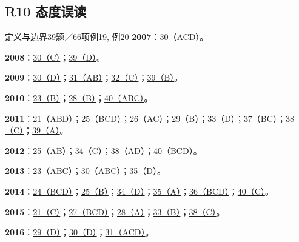 \documentclass[11pt,a4paper]{article}
\begin{document}
\subsection{R10 态度误读}\label{class-R10}
\noindent \hyperref[cat-R10]{定义与边界}\quad 39题／66项\quad \hyperref[case-2011-T1-Q25]{例19}, \hyperref[case-2016-T3-Q31]{例20}
\noindent\textbf{2007}：\hyperref[idx-2007-T2-Q30]{30（ACD）}。\par
\noindent\textbf{2008}：\hyperref[idx-2008-T2-Q30]{30（C）}；\hyperref[idx-2008-T4-Q39]{39（D）}。\par
\noindent\textbf{2009}：\hyperref[idx-2009-T2-Q30]{30（D）}；\hyperref[idx-2009-T3-Q31]{31（AB）}；\hyperref[idx-2009-T3-Q32]{32（C）}；\hyperref[idx-2009-T4-Q39]{39（B）}。\par
\noindent\textbf{2010}：\hyperref[idx-2010-T1-Q23]{23（B）}；\hyperref[idx-2010-T2-Q28]{28（B）}；\hyperref[idx-2010-T4-Q40]{40（ABC）}。\par
\noindent\textbf{2011}：\hyperref[idx-2011-T1-Q21]{21（ABD）}；\hyperref[idx-2011-T1-Q25]{25（BCD）}；\hyperref[idx-2011-T2-Q26]{26（AC）}；\hyperref[idx-2011-T2-Q29]{29（B）}；\hyperref[idx-2011-T3-Q33]{33（D）}；\hyperref[idx-2011-T4-Q37]{37（BC）}；\hyperref[idx-2011-T4-Q38]{38（C）}；\hyperref[idx-2011-T4-Q39]{39（A）}。\par
\noindent\textbf{2012}：\hyperref[idx-2012-T1-Q25]{25（AB）}；\hyperref[idx-2012-T3-Q34]{34（C）}；\hyperref[idx-2012-T4-Q38]{38（AD）}；\hyperref[idx-2012-T4-Q40]{40（BCD）}。\par
\noindent\textbf{2013}：\hyperref[idx-2013-T1-Q23]{23（ABC）}；\hyperref[idx-2013-T2-Q30]{30（ABC）}；\hyperref[idx-2013-T3-Q35]{35（D）}。\par
\noindent\textbf{2014}：\hyperref[idx-2014-T1-Q24]{24（BCD）}；\hyperref[idx-2014-T1-Q25]{25（B）}；\hyperref[idx-2014-T3-Q34]{34（D）}；\hyperref[idx-2014-T3-Q35]{35（A）}；\hyperref[idx-2014-T4-Q36]{36（BCD）}；\hyperref[idx-2014-T4-Q40]{40（C）}。\par
\noindent\textbf{2015}：\hyperref[idx-2015-T1-Q21]{21（C）}；\hyperref[idx-2015-T2-Q27]{27（BCD）}；\hyperref[idx-2015-T2-Q28]{28（A）}；\hyperref[idx-2015-T3-Q33]{33（B）}；\hyperref[idx-2015-T4-Q38]{38（C）}。\par
\noindent\textbf{2016}：\hyperref[idx-2016-T2-Q29]{29（D）}；\hyperref[idx-2016-T2-Q30]{30（D）}；\hyperref[idx-2016-T3-Q31]{31（ACD）}。\par
{}
\end{document}
